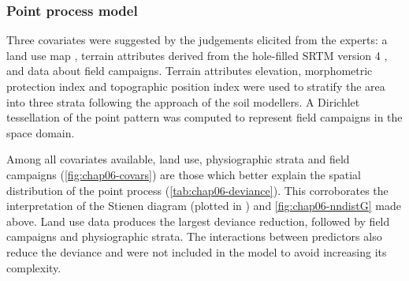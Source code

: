\subsubsection{Point process model}

Three covariates were suggested by the judgements elicited from the experts: a land use map 
\cite{SamuelRosaEtAl2011a}, terrain attributes derived from the hole-filled SRTM version \num{4} 
\cite{ReuterEtAl2007,Jarvis2008}, and data about field campaigns. Terrain attributes elevation, morphometric 
protection index and topographic position index were used to stratify the area into three strata following the 
approach of the soil modellers. A Dirichlet tessellation of the point pattern was computed to represent field 
campaigns in the space domain.

Among all covariates available, land use, physiographic strata and field campaigns 
(\autoref{fig:chap06-covars}) are those which better explain the spatial distribution of the point process 
(\autoref{tab:chap06-deviance}). This corroborates the interpretation of the Stienen diagram (plotted in 
\googleearth) and \autoref{fig:chap06-nndistG} made above. Land use data produces the largest deviance 
reduction, followed by field campaigns and physiographic strata. The interactions between predictors also 
reduce the deviance and were not included in the model to avoid increasing its complexity.

